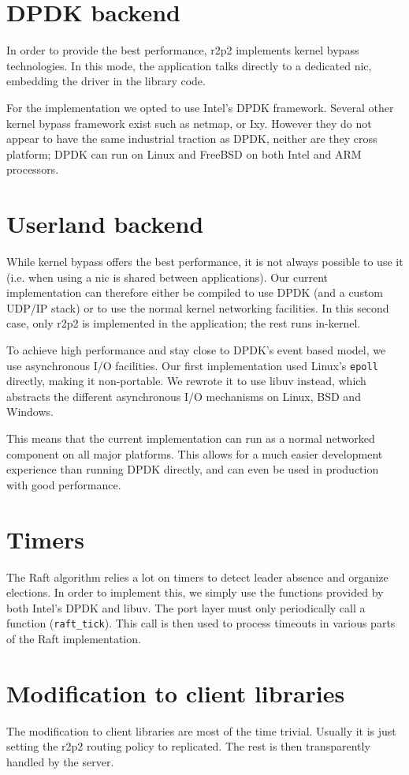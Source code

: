 \section{DPDK backend}

In order to provide the best performance, \gls{r2p2} implements kernel bypass technologies.
In this mode, the application talks directly to a dedicated \gls{nic}, embedding the driver in the library code.

For the implementation we opted to use Intel's DPDK framework.
Several other kernel bypass framework exist such as netmap\cite{netmap}, or Ixy\cite{ixy}.
However they do not appear to have the same industrial traction as DPDK, neither are they cross platform; DPDK can run on Linux and FreeBSD on both Intel and ARM processors.

\section{Userland backend}

While kernel bypass offers the best performance, it is not always possible to use it (i.e. when using a \gls{nic} is shared between applications).
Our current implementation can therefore either be compiled to use DPDK (and a custom UDP/IP stack) or to use the normal kernel networking facilities.
In this second case, only \gls{r2p2} is implemented in the application; the rest runs in-kernel.

To achieve high performance and stay close to DPDK's event based model, we use asynchronous I/O facilities.
Our first implementation used Linux's \texttt{epoll} directly, making it non-portable.
We rewrote it to use libuv instead, which abstracts the different asynchronous I/O mechanisms on Linux, BSD and Windows.

This means that the current implementation can run as a normal networked component on all major platforms.
This allows for a much easier development experience than running DPDK directly, and can even be used in production with good performance.

\section{Timers}

The Raft algorithm relies a lot on timers to detect leader absence and organize elections.
In order to implement this, we simply use the functions provided by both Intel's DPDK and libuv.
The port layer must only periodically call a function (\texttt{raft\_tick}).
This call is then used to process timeouts in various parts of the Raft implementation.

\section{Modification to client libraries}

The modification to client libraries are most of the time trivial.
Usually it is just setting the \gls{r2p2} routing policy to replicated.
The rest is then transparently handled by the server.
